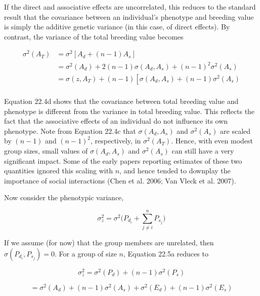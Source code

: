 \documentclass{article}
\begin{document}
If the direct and associative effects are uncorrelated, this reduces to the standard result that the covariance between an individual's phenotype and breeding value is simply the additive genetic variance (in this case, of direct effects). By contrast, the variance of the total breeding value becomes

\begin{equation}
\begin{aligned}\sigma^{2}(A_{T})&=\sigma^{2}\left[A_{d}+(n-1)A_{s}\right]\\&=\sigma^{2}(A_{d})+2(n-1)\sigma(A_{d},A_{s})+(n-1)^{2}\sigma^{2}(A_{s})\\&=\sigma(z,A_{T})+(n-1)\left[\sigma(A_{d},A_{s})+(n-1)\sigma^{2}(A_{s})\right.\\ \end{aligned}
\tag{22.4c}
\label{eq:22_4c}
\end{equation}

Equation 22.4d shows that the covariance between total breeding value and phenotype is different from the variance in total breeding value. This reflects the fact that the associative effects of an individual do not influence its own phenotype. Note from Equation 22.4c that  $ \sigma(A_d, A_s) $ and  $ \sigma^2(A_s) $ are scaled by  $ (n-1) $ and  $ (n-1)^2 $, respectively, in  $ \sigma^2(A_T) $. Hence, with even modest group sizes, small values of  $ \sigma(A_d, A_s) $ and  $ \sigma^2(A_s) $ can still have a very significant impact. Some of the early papers reporting estimates of these two quantities ignored this scaling with  $ n $, and hence tended to downplay the importance of social interactions (Chen et al. 2006; Van Vleck et al. 2007).

Now consider the phenotypic variance,

\begin{equation}
\sigma_{z}^{2}=\sigma^{2}\bigg(P_{d_{i}}+\sum_{j\neq i}^{n}P_{s_{j}}\bigg)
\tag{22.5a}
\label{eq:22_5a}
\end{equation}

If we assume (for now) that the group members are unrelated, then  $ \sigma(P_{d_i}, P_{s_j}) = 0 $. For a group of size  $ n $, Equation 22.5a reduces to

\begin{equation}
\sigma_{z}^{2}=\sigma^{2}(P_{d})+(n-1)\sigma^{2}(P_{s})
\tag{22.5b}
\label{eq:22_5b}
\end{equation}

\begin{equation}
=\sigma^{2}(A_{d})+(n-1)\sigma^{2}(A_{s})+\sigma^{2}(E_{d})+(n-1)\sigma^{2}(E_{s})
\tag{22.5c}
\label{eq:22_5c}
\end{equation}
\end{document}
